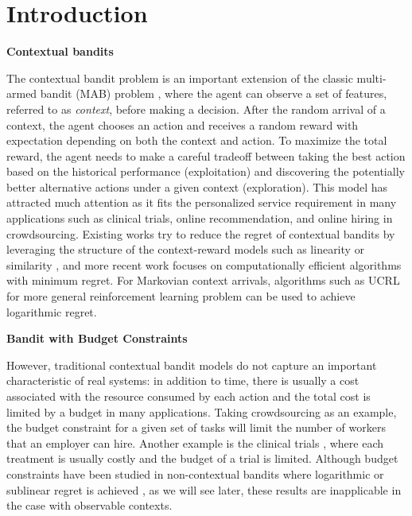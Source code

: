 \section{Introduction } \label{sec:intro}

\textbf{Contextual bandits}

The contextual bandit problem \cite{Langford2007NIPS,Lu2010ICAIS:CMAB,Zhou2015CMAB:Survey} is an important extension of the classic multi-armed bandit (MAB) problem \cite{Auer2002ML:UCB}, where  the agent can observe a set of features, referred to as \emph{context}, before making a decision. %
After the random arrival of a context, the agent chooses an action and receives a random reward with expectation depending on both the context and action.
To maximize the total reward, {the agent needs to make a careful tradeoff between taking the best action based on the historical performance (exploitation) and discovering the potentially better alternative actions under a given context (exploration).}
This model has attracted much attention as it fits the personalized service requirement in many applications such as clinical trials, online recommendation, and online hiring in crowdsourcing.
Existing works try to reduce  the regret of contextual bandits by leveraging the structure of the context-reward models such as linearity \cite{Li2010WWW:LinUCB} or similarity \cite{Slivkins2014JMLR:ContMAB}, and more recent work \cite{Agarwal2014ICML:CMAB} focuses on computationally efficient algorithms with minimum regret. For Markovian context arrivals, algorithms such as UCRL \cite{Auer2007UCB4RL} for more general reinforcement learning problem can be used to achieve logarithmic regret.

\textbf{Bandit with Budget Constraints}

However, traditional contextual bandit models do not capture an important characteristic of real systems: in addition to time, there is usually a cost associated with the  resource consumed by each action and the total cost is limited by a budget in many applications. Taking crowdsourcing \cite{Badanidiyuru2012EC:OnlineProcurement} as an example, the budget constraint for a given set of tasks will limit the number of workers that an employer can hire. Another example is the clinical trials \cite{Lai2012SA}, where each treatment is usually costly and the budget of a trial is limited.
Although budget constraints have been studied in non-contextual bandits where logarithmic or sublinear regret is achieved \cite{Tran2012AAAI:MAB_BF,Badanidiyuru2013FOCS,Jiang2013CDC,Slivkins2013TR,Qin&Liu2015IJCAI:TS,Combes&Srikant2015Sigmetrics,Flajolet&Patrick2015TR:BwK}, as we will see later, these results are inapplicable in the case with observable contexts.


